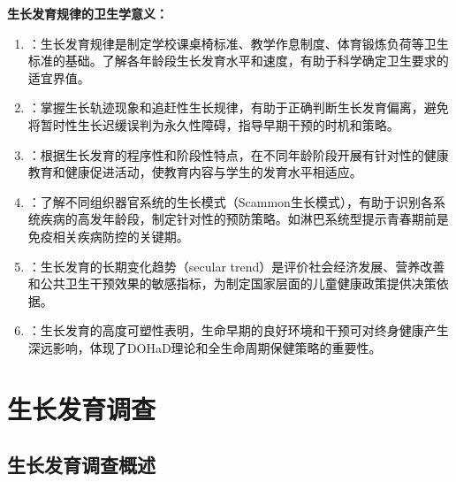 \begin{keybox}
\textbf{生长发育规律的卫生学意义：}

\begin{enumerate}[leftmargin=*]
    \item {}：生长发育规律是制定学校课桌椅标准、教学作息制度、体育锻炼负荷等卫生标准的基础。了解各年龄段生长发育水平和速度，有助于科学确定卫生要求的适宜界值。

    \item {}：掌握生长轨迹现象和追赶性生长规律，有助于正确判断生长发育偏离，避免将暂时性生长迟缓误判为永久性障碍，指导早期干预的时机和策略。

    \item {}：根据生长发育的程序性和阶段性特点，在不同年龄阶段开展有针对性的健康教育和健康促进活动，使教育内容与学生的发育水平相适应。

    \item {}：了解不同组织器官系统的生长模式（Scammon生长模式），有助于识别各系统疾病的高发年龄段，制定针对性的预防策略。如淋巴系统型提示青春期前是免疫相关疾病防控的关键期。

    \item {}：生长发育的长期变化趋势（secular trend）是评价社会经济发展、营养改善和公共卫生干预效果的敏感指标，为制定国家层面的儿童健康政策提供决策依据。

    \item {}：生长发育的高度可塑性表明，生命早期的良好环境和干预可对终身健康产生深远影响，体现了DOHaD理论和全生命周期保健策略的重要性。
\end{enumerate}
\end{keybox}

\section{生长发育调查}

\subsection{生长发育调查概述}

